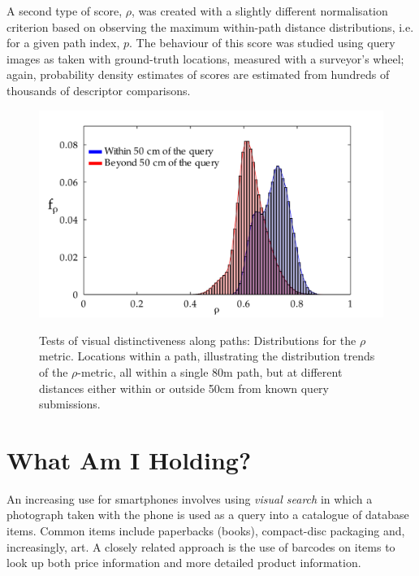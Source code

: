A second type of score, $\rho$, was created with a slightly different normalisation criterion based on observing the maximum within-path distance distributions, i.e. for a given path index, $p$.  The behaviour of this score was studied using query images as taken with ground-truth locations, measured with a surveyor's wheel; again, probability density estimates of scores are estimated from hundreds of thousands of descriptor comparisons.


\begin{figure}[ht]
\centering
{\includegraphics[width=\linewidth]{./gfx/Chapter02/C5distributions_no_smoothingWithSmoothedHistograms-latex.pdf}}
\caption{Tests of visual distinctiveness along paths: Distributions for the $\rho$ metric. Locations within a path, illustrating the distribution trends of the $\rho$-metric, all within a single 80m path, but at different distances either within or outside 50cm from known query submissions.}        
\label{fig:rhoDistribution}
\end{figure}



\section{What Am I Holding?}

An increasing use for smartphones involves using {\it visual search} in which a photograph taken with the phone is used as a query into a catalogue of database items.  Common items include paperbacks (books), compact-disc packaging and, increasingly, art.  A closely related approach is the use of barcodes on items to look up both price information and more detailed product information.  

